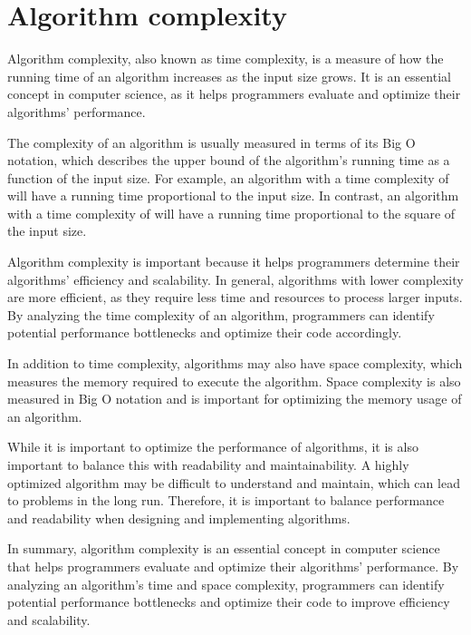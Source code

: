 \documentclass[letterpaper,12pt,english]{book}
\begin{document}
\section{Algorithm complexity}
\label{\detokenize{intro:algorithm-complexity}}
\sphinxAtStartPar
Algorithm complexity, also known as time complexity, is a measure of how the running time of an algorithm increases as the input size grows. It is an essential concept in computer science, as it helps programmers evaluate and optimize their algorithms’ performance.

\sphinxAtStartPar
The complexity of an algorithm is usually measured in terms of its Big O notation, which describes the upper bound of the algorithm’s running time as a function of the input size. For example, an algorithm with a time complexity of  will have a running time proportional to the input size. In contrast, an algorithm with a time complexity of  will have a running time proportional to the square of the input size.

\sphinxAtStartPar
Algorithm complexity is important because it helps programmers determine their algorithms’ efficiency and scalability. In general, algorithms with lower complexity are more efficient, as they require less time and resources to process larger inputs. By analyzing the time complexity of an algorithm, programmers can identify potential performance bottlenecks and optimize their code accordingly.

\sphinxAtStartPar
In addition to time complexity, algorithms may also have space complexity, which measures the memory required to execute the algorithm. Space complexity is also measured in Big O notation and is important for optimizing the memory usage of an algorithm.

\sphinxAtStartPar
While it is important to optimize the performance of algorithms, it is also important to balance this with readability and maintainability. A highly optimized algorithm may be difficult to understand and maintain, which can lead to problems in the long run. Therefore, it is important to balance performance and readability when designing and implementing algorithms.

\sphinxAtStartPar
In summary, algorithm complexity is an essential concept in computer science that helps programmers evaluate and optimize their algorithms’ performance. By analyzing an algorithm’s time and space complexity, programmers can identify potential performance bottlenecks and optimize their code to improve efficiency and scalability.
\end{document}
